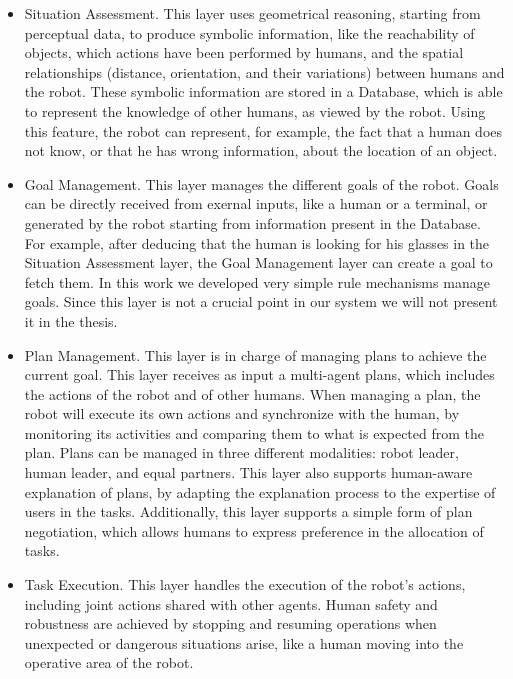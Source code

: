\begin{itemize}
\item Situation Assessment. This layer uses geometrical reasoning, starting from perceptual data, to produce symbolic information, like the reachability of objects, which actions have been performed by humans, and the spatial relationships (distance, orientation, and their variations) between humans and the robot. These symbolic information are stored in a Database, which is able to represent the knowledge of other humans, as viewed by the robot. Using this feature, the robot can represent, for example, the fact that a human does not know, or that he has wrong information, about the location of an object. 
\item Goal Management. This layer manages the different goals of the robot. Goals can be directly received from exernal inputs, like a human or a terminal, or generated by the robot starting from information present in the Database. For example, after deducing that the human is looking for his glasses in the Situation Assessment layer, the Goal Management layer can create a goal to fetch them. In this work we developed very simple rule mechanisms manage goals. Since this layer is not a crucial point in our system we will not present it in the thesis.
\item Plan Management. This layer is in charge of managing plans to achieve the current goal. This layer receives as input a multi-agent plans, which includes the actions of the robot and of other humans. When managing a plan, the robot will execute its own actions and synchronize with the human, by monitoring its activities and comparing them to what is expected from the plan.
Plans can be managed in three different modalities: robot leader, human leader, and equal partners.  This layer also supports human-aware explanation of plans, by adapting the explanation process to the expertise of users in the tasks. Additionally, this layer supports a simple form of plan negotiation, which allows humans to express preference in the allocation of tasks.
\item Task Execution. This layer handles the execution of the robot's actions, including joint actions shared with other agents. Human safety and robustness are achieved by stopping and resuming operations  when unexpected or dangerous situations arise, like a human moving into the operative area of the robot.
\end{itemize}


